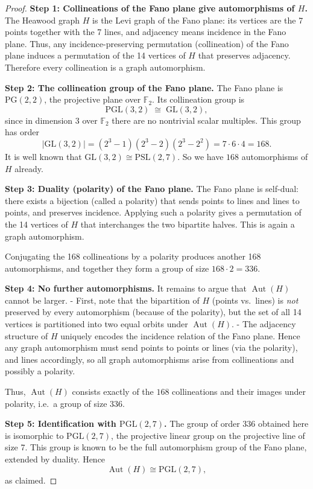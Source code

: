 \documentclass[12pt,a4paper,openany]{book}
\begin{document}
\begin{proof}
\textbf{Step 1: Collineations of the Fano plane give automorphisms of $H$.}  
The Heawood graph $H$ is the Levi graph of the Fano plane: its vertices are the 7 points together with the 7 lines, and adjacency means incidence in the Fano plane.  
Thus, any incidence-preserving permutation (collineation) of the Fano plane induces a permutation of the 14 vertices of $H$ that preserves adjacency. Therefore every collineation is a graph automorphism.

\textbf{Step 2: The collineation group of the Fano plane.}  
The Fano plane is $\mathrm{PG}(2,2)$, the projective plane over $\mathbb F_2$. Its collineation group is 
\[
\mathrm{PGL}(3,2) \;\cong\; \mathrm{GL}(3,2),
\]
since in dimension 3 over $\mathbb F_2$ there are no nontrivial scalar multiples. This group has order
\[
|\mathrm{GL}(3,2)| = (2^3-1)(2^3-2)(2^3-2^2) = 7 \cdot 6 \cdot 4 = 168.
\]
It is well known that $\mathrm{GL}(3,2)\cong \mathrm{PSL}(2,7)$. So we have $168$ automorphisms of $H$ already.

\textbf{Step 3: Duality (polarity) of the Fano plane.}  
The Fano plane is self-dual: there exists a bijection (called a polarity) that sends points to lines and lines to points, and preserves incidence. Applying such a polarity gives a permutation of the 14 vertices of $H$ that interchanges the two bipartite halves. This is again a graph automorphism.  

Conjugating the 168 collineations by a polarity produces another 168 automorphisms, and together they form a group of size $168 \cdot 2 = 336$.

\textbf{Step 4: No further automorphisms.}  
It remains to argue that $\operatorname{Aut}(H)$ cannot be larger.  
- First, note that the bipartition of $H$ (points vs.\ lines) is \emph{not} preserved by every automorphism (because of the polarity), but the set of all 14 vertices is partitioned into two equal orbits under $\operatorname{Aut}(H)$.  
- The adjacency structure of $H$ uniquely encodes the incidence relation of the Fano plane. Hence any graph automorphism must send points to points or lines (via the polarity), and lines accordingly, so all graph automorphisms arise from collineations and possibly a polarity.  

Thus, $\operatorname{Aut}(H)$ consists exactly of the $168$ collineations and their images under polarity, i.e.\ a group of size $336$.

\textbf{Step 5: Identification with $\mathrm{PGL}(2,7)$.}  
The group of order $336$ obtained here is isomorphic to $\mathrm{PGL}(2,7)$, the projective linear group on the projective line of size 7. This group is known to be the full automorphism group of the Fano plane, extended by duality. Hence
\[
\operatorname{Aut}(H)\cong \mathrm{PGL}(2,7),
\]
as claimed.
\end{proof}
\end{document}
